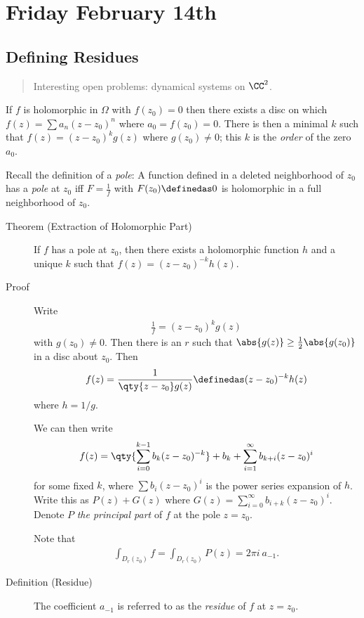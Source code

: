 \hypertarget{friday-february-14th}{%
\section{Friday February 14th}\label{friday-february-14th}}

\hypertarget{defining-residues}{%
\subsection{Defining Residues}\label{defining-residues}}

\begin{quote}
Interesting open problems: dynamical systems on \(\CC^2\).
\end{quote}

If \(f\) is holomorphic in \(\Omega\) with \(f(z_0) = 0\) then there
exists a disc on which \(f(z) = \sum a_n (z-z_0)^n\) where
\(a_0 = f(z_0) = 0\). There is then a minimal \(k\) such that
\(f(z) = (z-z_0)^k g(z)\) where \(g(z_0)\neq 0\); this \(k\) is the
\emph{order} of the zero \(a_0\).

Recall the definition of a \emph{pole}: A function defined in a deleted
neighborhood of \(z_0\) has a \emph{pole} at \(z_0\) iff
\(F = \frac 1 f\) with \(F(z_0) \definedas 0\) is holomorphic in a full
neighborhood of \(z_0\).

\begin{description}
\item[Theorem (Extraction of Holomorphic Part)]
If \(f\) has a pole at \(z_0\), then there exists a holomorphic function
\(h\) and a unique \(k\) such that \(f(z) = (z-z_0)^{-k} h(z)\).
\item[Proof]
Write
\begin{align*}\frac 1 f = (z-z_0)^k g(z)\end{align*} with
\(g(z_0) \neq 0\). Then there is an \(r\) such that
\(\abs{g(z)} \geq \frac 1 2 \abs{g(z_0)}\) in a disc about \(z_0\). Then
\begin{align*}f(z) = \frac{1}{\qty{z-z_0} g(z)} \definedas (z-z_0)^{-k} h(z)\end{align*}
where \(h = 1/g\).

We can then write
\begin{align*}f(z) = \qty{ \sum_{i=0}^{k-1} b_k (z-z_0)^{-k} } + b_k + \sum_{i=1}^\infty b_{k+i} (z-z_0)^i\end{align*}
for some fixed \(k\), where \(\sum b_i (z-z_0)^i\) is the power series
expansion of \(h\). Write this as \(P(z) + G(z)\) where
\(G(z) = \sum_{i=0}^\infty b_{i+k}(z-z_0)^i\). Denote \(P\) \emph{the
principal part} of \(f\) at the pole \(z=z_0\).

Note that
\begin{align*}\int_{D_r(z_0)} f = \int_{D_r(z_0)} P(z) = 2\pi i ~a_{-1}.\end{align*}
\item[Definition (Residue)]
The coefficient \(a_{-1}\) is referred to as the \emph{residue} of \(f\)
at \(z=z_0\).
\end{description}

